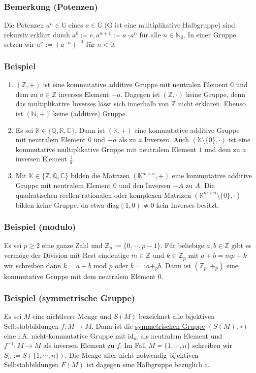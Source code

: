 \subsubsection{Bemerkung (Potenzen)}
Die Potenzen $a^n\in \mathbb{G}$ eines $a\in\mathbb{G}$ (G ist eine multiplikative Halbgruppe) sind rekursiv erklärt durch $a^0:=e, a^{n+1}:=a\cdot a^n$ für alle $n\in\mathbb{N}_0$.  In einer Gruppe setzen wir $a^n:=(a^{-n})^{-1}$ für $n<0$.
\subsubsection{Beispiel}
\begin{enumerate}
\item $(\mathbb{Z},+)$ ist eine kommutative additive Gruppe mit neutralen Element $0$ und dem zu $a\in\mathbb{Z}$ inverses Element $-a$.  Dagegen ist $(\mathbb{Z},\cdot )$ keine Gruppe, denn das multiplikative Inverses lässt sich innerhalb von $\mathbb{Z}$ nicht erklären.  Ebenso ist $(\mathbb{N},+)$ keine (additive) Gruppe.
\item Es sei $\mathbb{K}\in \{\mathbb{Q},\mathbb{R},\mathbb{C}\}$. Dann ist $(\mathbb{K},+)$ eine kommutative additive Gruppe mit neutralem Element $0$ und $-a$ als zu $a$ Inversen.  Auch $(\mathbb{K}\setminus \{0\},\cdot )$ ist eine kommutative multiplikative Gruppe mit neutralem Element $1$ und dem zu $a$ inversen Element $\frac{1}{a}$.
\item Mit $\mathbb{K}\in\{\mathbb{Z},\mathbb{Q},\mathbb{C}\}$ bilden die Matrizen $(\mathbb{K}^{m\times n},+)$ eine kommutative additive Gruppe mit neutralem Element $0$ und den Inversen $-A$ zu $A$.  Die quadratischen reellen rationalen oder komplexen Matrizen $(\mathbb{K}^{m\times n}\setminus \{0\},\cdot)$ bilden keine Gruppe, da etwa diag$(1,0)\not= 0$ kein Inverses besitzt.
\end{enumerate}
\addtocounter{subsubsection}{1}
\subsubsection{Beispiel (modulo)}
Es sei $p\geq 2$ eine ganze Zahl und $\mathbb{Z}_p:=\{0,\cdots ,p-1\}$.  Für beliebige $a,b\in\mathbb{Z}$ gibt es vermöge der Division mit Rest eindeutige $m\in\mathbb{Z}$ und $k\in\mathbb{Z}_p$ mit $a+b=mp+k$ wir schreiben dann $k=a+b$ mod $p$ oder $k=:a+_p b$.  Dann ist $(\mathbb{Z}_p,+_p)$ eine kommutative Gruppe mit dem neutralem Element $0$.
\subsubsection{Beispiel (symmetrische Gruppe)}
Es sei $M$ eine nichtleere Menge und $S(M)$ bezeichnet alle bijektiven Selbstabbildungen $f:M\rightarrow M$.  Dann ist die \underline{symmetrischen Gruppe} $(S(M),\circ )$ eine i.A. nicht-kommutative Gruppe mit id$_m$ als neutralem Element und $f^{-1}:M\rightarrow M$ als inversen Element zu $f$.  Im Fall $M=\{1,\cdots ,n\}$ schreiben wir $S_n:=S(\{1,\cdots ,n\})$.  Die Menge aller nicht-notwendig bijektiven Selbstabbildungen $F(M)$ ist dagegen eine Halbgruppe bezüglich $\circ$.

